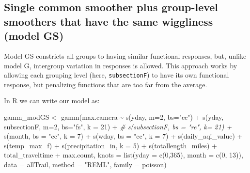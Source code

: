 \documentclass[
]{book}
\newenvironment{Shaded}{\begin{snugshade}}{\end{snugshade}}
\newcommand{\AttributeTok}[1]{\textcolor[rgb]{0.77,0.63,0.00}{#1}}
\newcommand{\CommentTok}[1]{\textcolor[rgb]{0.56,0.35,0.01}{\textit{#1}}}
\newcommand{\DecValTok}[1]{\textcolor[rgb]{0.00,0.00,0.81}{#1}}
\newcommand{\FunctionTok}[1]{\textcolor[rgb]{0.00,0.00,0.00}{#1}}
\newcommand{\NormalTok}[1]{#1}
\newcommand{\OtherTok}[1]{\textcolor[rgb]{0.56,0.35,0.01}{#1}}
\newcommand{\SpecialCharTok}[1]{\textcolor[rgb]{0.00,0.00,0.00}{#1}}
\newcommand{\StringTok}[1]{\textcolor[rgb]{0.31,0.60,0.02}{#1}}
\begin{document}
\hypertarget{single-common-smoother-plus-group-level-smoothers-that-have-the-same-wiggliness-model-gs}{%
\subsection{Single common smoother plus group-level smoothers that have the same wiggliness (model GS)}\label{single-common-smoother-plus-group-level-smoothers-that-have-the-same-wiggliness-model-gs}}

Model GS constricts all groups to having similar functional responses, but, unlike model G, intergroup variation in responses is allowed. This approach works by allowing each grouping level (here, \texttt{subsectionF}) to have its own functional response, but penalizing functions that are too far from the average.

In R we can write our model as:

\begin{Shaded}
\begin{Highlighting}[]
\NormalTok{gamm\_modGS }\OtherTok{\textless{}{-}} \FunctionTok{gamm}\NormalTok{(max.camera }\SpecialCharTok{\textasciitilde{}} 
                     \FunctionTok{s}\NormalTok{(yday, }\AttributeTok{m=}\DecValTok{2}\NormalTok{, }\AttributeTok{bs=}\StringTok{"cc"}\NormalTok{) }\SpecialCharTok{+}
                     \FunctionTok{s}\NormalTok{(yday, subsectionF,}
                       \AttributeTok{m=}\DecValTok{2}\NormalTok{, }\AttributeTok{bs=}\StringTok{"fs"}\NormalTok{, }\AttributeTok{k =} \DecValTok{21}\NormalTok{) }\SpecialCharTok{+}
                     \CommentTok{\# s(subsectionF, bs = "re", k= 21) +}
                     \FunctionTok{s}\NormalTok{(month, }\AttributeTok{bs =} \StringTok{"cc"}\NormalTok{, }\AttributeTok{k =} \DecValTok{7}\NormalTok{) }\SpecialCharTok{+}
                     \FunctionTok{s}\NormalTok{(wday,}
                       \AttributeTok{bs =} \StringTok{"cc"}\NormalTok{, }\AttributeTok{k =} \DecValTok{7}\NormalTok{) }\SpecialCharTok{+}
                     \FunctionTok{s}\NormalTok{(daily\_aqi\_value) }\SpecialCharTok{+}
                     \FunctionTok{s}\NormalTok{(temp\_max\_f) }\SpecialCharTok{+}
                     \FunctionTok{s}\NormalTok{(precipitation\_in, }\AttributeTok{k =} \DecValTok{5}\NormalTok{) }\SpecialCharTok{+}
                     \FunctionTok{s}\NormalTok{(totallength\_miles) }\SpecialCharTok{+} 
\NormalTok{                     total\_traveltime }\SpecialCharTok{+}
\NormalTok{                     max.count,}
                   \AttributeTok{knots =} \FunctionTok{list}\NormalTok{(}\AttributeTok{yday =} \FunctionTok{c}\NormalTok{(}\DecValTok{0}\NormalTok{,}\DecValTok{365}\NormalTok{),}
                                \AttributeTok{month =} \FunctionTok{c}\NormalTok{(}\DecValTok{0}\NormalTok{, }\DecValTok{13}\NormalTok{)),}
                   \AttributeTok{data =}\NormalTok{ allTrail, }
                   \AttributeTok{method =} \StringTok{"REML"}\NormalTok{, }
                   \AttributeTok{family =}\NormalTok{ poisson)}
\end{Highlighting}
\end{Shaded}
\end{document}
